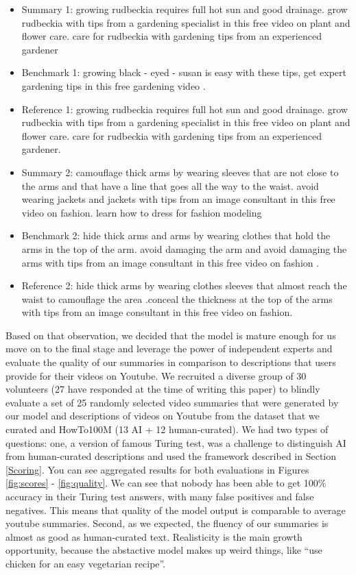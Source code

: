 \documentclass{article}
\begin{document}
\begin{itemize}

\item Summary 1: growing rudbeckia requires full hot sun and good drainage. grow rudbeckia with tips from a gardening specialist in this free video on plant and flower care. care for rudbeckia with gardening tips from an experienced gardener
\item Benchmark 1: growing black - eyed - susan is easy with these tips, get expert gardening tips in this free gardening video .
\item Reference 1: growing rudbeckia requires full hot sun and good drainage. grow rudbeckia with tips from a gardening specialist in this free video on plant and flower care. care for rudbeckia with gardening tips from an experienced gardener.
 
\item Summary 2: camouflage thick arms by wearing sleeves that are not close to the arms and that have a line that goes all the way to the waist. avoid wearing jackets and jackets with tips from an image consultant in this free video on fashion. learn how to dress for fashion modeling
\item Benchmark 2: hide thick arms and arms by wearing clothes that hold the arms in the top of the arm. avoid damaging the arm and avoid damaging the arms with tips from an image consultant in this free video on fashion .
\item Reference 2: hide thick arms by wearing clothes sleeves that almost reach the waist to camouflage the area .conceal the thickness at the top of the arms with tips from an image consultant in this free video on fashion.

\end{itemize}

Based on that observation, we decided that the model is mature enough for us move on to the final stage and leverage the power of independent experts and evaluate the quality of our summaries in comparison to descriptions that users provide for their videos on Youtube. We recruited a diverse group of 30 volunteers (27 have responded at the time of writing this paper) to blindly evaluate a set of 25 randomly selected video summaries  that were generated by our model and descriptions of videos on Youtube  from the dataset that we curated and HowTo100M (13 AI + 12 human-curated). We had two types of questions: one, a version of famous Turing test, was a challenge to distinguish AI from human-curated descriptions and used the framework described in Section \ref{Scoring}. You can see aggregated results for both evaluations in Figures \ref{fig:scores} - \ref{fig:quality}. We can see that nobody has been able to get 100\% accuracy in their Turing test answers, with many false positives and false negatives. This means that quality of the model output is comparable to average youtube summaries. Second, as we expected, the fluency of our summaries is almost as good as  human-curated text. Realisticity is the main growth opportunity, because the abstactive model makes up weird things, like “use chicken for an easy vegetarian recipe”.
\end{document}
